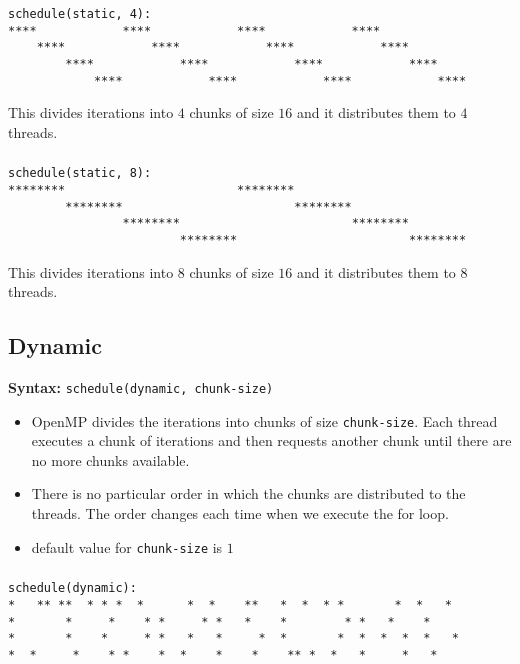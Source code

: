 \documentclass[paper=letter, fontsize=12pt]{article}
\begin{document}
\subsubsection{}
\begin{verbatim}
schedule(static, 4):   
****            ****            ****            ****            
    ****            ****            ****            ****        
        ****            ****            ****            ****    
            ****            ****            ****            ****
\end{verbatim}
This divides iterations into $ 4 $ chunks of size $ 16 $ and it distributes them to $ 4 $ threads. 

\subsubsection{}
\begin{verbatim}
schedule(static, 8):   
********                        ********                        
        ********                        ********                
                ********                        ********        
                        ********                        ********
\end{verbatim}
This divides iterations into $ 8 $ chunks of size $ 16 $ and it distributes them to $ 8 $ threads. 

\subsection{Dynamic}
\textbf{Syntax:} \verb|schedule(dynamic, chunk-size)|
\begin{itemize}
    \item OpenMP divides the iterations into chunks of size \verb|chunk-size|. Each thread executes a chunk of iterations and then requests another chunk until there are no more chunks available.
    \item There is no particular order in which the chunks are distributed to the threads. The order changes each time when we execute the for loop.
    \item default value for \verb|chunk-size| is $ 1 $
\end{itemize}

\subsubsection{}
\begin{verbatim}
schedule(dynamic):
*   ** **  * * *  *      *  *    **   *  *  * *       *  *   *  
*       *     *    * *     * *   *    *        * *   *    *   
*       *    *     * *   *   *     *  *       *  *  *  *  *   *
*  *     *    * *    *  *    *    *    ** *  *   *     *   * 
\end{verbatim}
\end{document}
